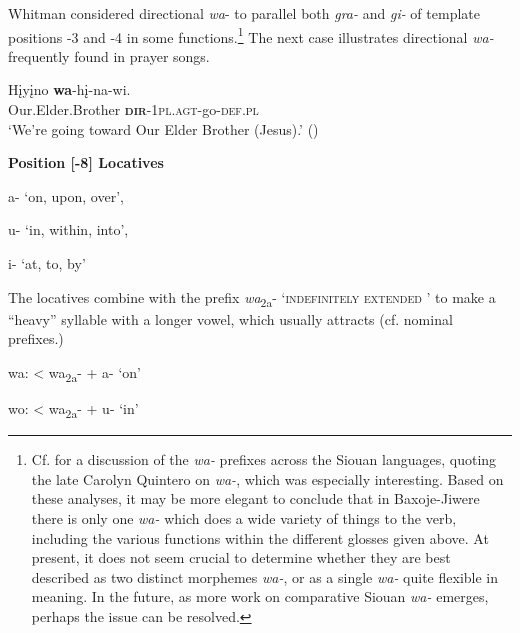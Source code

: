 \documentclass[output=paper]{LSP/langsci}
\begin{document}
Whitman considered directional \textit{wa}- to parallel both \textit{gra-} and \textit{gi-} of template positions -3 and -4 in some functions.\footnote{Cf. \citet{Boyle2009} for a discussion of the \textit{wa-} prefixes across the Siouan languages, quoting the late Carolyn Quintero on  \textit{wa-}, which was especially interesting. Based on these analyses, it may be more elegant to conclude that in Baxoje-Jiwere there is only one \textit{wa-} which does a wide variety of things to the verb, including the various functions within the different glosses given above. At present, it does not seem crucial to determine whether they are best described as two distinct morphemes \textit{wa-}, or as a single \textit{wa-} quite flexible in meaning. In the future, as more work on comparative Siouan \textit{wa-} emerges, perhaps the issue can be resolved.} The next case illustrates directional \textit{wa-} frequently found in prayer songs.	         		

\begin{exe}
\ex \gll H\k{i}y\k{i}no     \textbf{wa}-h\k{i}-na-wi. \\				      	        
Our.Elder.Brother	  \textbf{\textsc{dir}}-1\textsc{pl.agt}-go-\textsc{def.pl} \\		           	  	        
\trans `We're going toward Our Elder Brother (Jesus).' (\citealt{Davidson1997})	
\end{exe}

\textbf{Position [-8] Locatives}  	

\hspace{2em} a- `on, upon, over', 												

\hspace{2em} u- `in, within, into', 												

\hspace{2em} i- `at, to, by' \citep[241]{Whitman1947} 			

\vspace{1em}		 	     	     
 The locatives combine with the prefix \textit{wa}\textsubscript{2a}- `\textsc{indefinitely extended }' to make a ``heavy'' syllable with a longer vowel, which usually attracts  (cf. nominal prefixes.) 	      							

\vspace{1em}
\hspace{2em} wa:  < wa\textsubscript{2a}- + a-  `on'  	 							     	      		

\hspace{2em} wo:  < wa\textsubscript{2a}- + u-  `in'   									     		
\end{document}

